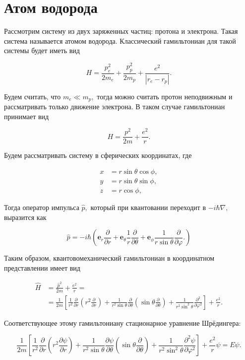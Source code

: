 \documentclass[b5paper]{book}
\begin{document}
\section*{Атом водорода}

Рассмотрим систему из двух заряженных частиц: протона и электрона. Такая система называется атомом водорода.
Классический гамильтониан для такой системы будет иметь вид

$$
H = \frac{p_e^2}{2m_e} + \frac{p_p^2}{2m_p} + \frac{e^2}{|r_e - r_p|}.
$$

Будем считать, что $m_e \ll m_p,$ тогда можно считать протон неподвижным и рассматривать только движение электрона. В таком случае
гамильтониан принимает вид

$$
H = \frac{p^2}{2m} + \frac{e^2}{r}.
$$

Будем рассматривать систему в сферических координатах, где

\begin{equation*}
\begin{aligned}
x &= r \sin \theta \cos \phi, \\
y &= r \sin \theta \sin \phi, \\
z &= r \cos \phi,
\end{aligned}
\end{equation*}

Тогда оператор импульса $\hat p,$ который при квантовании переходит в $-i\hbar \nabla,$ выразится как

$$
\hat p = -i\hbar \left({\mathbf e}_r\frac{\partial}{\partial r} + {\mathbf e}_{\theta} \frac 1 r \frac {\partial}{\partial \theta} + 
{\mathbf e}_{\phi}\frac{1}{r\sin\theta} \frac{\partial}{\partial \varphi}.
 \right)
$$

Таким образом, квантовомеханический гамильтониан в координатном представлении имеет вид

\begin{equation*}
\begin{aligned}
\hat H  &= \frac{\hat p^2}{2m} + \frac{e^2}{r} = \\
&= \frac{1}{2m} \left[\frac{1}{r^2}\frac{\partial}{\partial r}\left(r^2 \frac {\partial}{\partial r}\right)
 + \frac{1}{r^2 \sin\theta}\frac{\partial}{\partial \theta}
\left(\sin \theta \frac{\partial}{\partial \theta}\right)
+ \frac{1}{r^2\sin^2 \theta}\frac{\partial^2}{\partial \varphi^2}
\right] + \frac{e^2}{r}.
\end{aligned}
\end{equation*}

Соответствующее этому гамильтониану стационарное уравнение Шрёдингера:

\begin{equation}
\frac{1}{2m} \left[\frac{1}{r^2}\frac{\partial}{\partial r}\left(r^2 \frac {\partial\psi}{\partial r}\right)
 + \frac{1}{r^2 \sin\theta}\frac{\partial\psi}{\partial \theta}
\left(\sin \theta \frac{\partial}{\partial \theta}\right)
+ \frac{1}{r^2\sin^2 \theta}\frac{\partial^2 \psi}{\partial \varphi^2}
\right] + \frac{e^2}{r} \psi = E\psi.
\end{equation}
\end{document}

